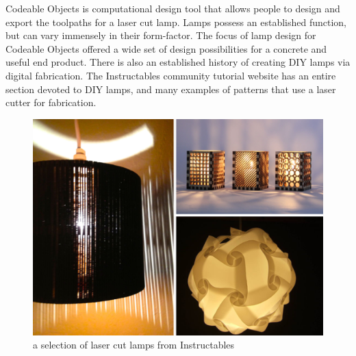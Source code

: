 Codeable Objects is computational design tool that allows people to design and export the toolpaths for a laser cut lamp. Lamps possess an established function, but can vary immensely in their form-factor. The focus of lamp design for Codeable Objects offered a wide set of design possibilities for a concrete and useful end product. There is also an established history of creating DIY lamps via digital fabrication. The Instructables community tutorial website has an entire section devoted to DIY lamps, and many examples of patterns that use a laser cutter for fabrication. 
\begin{center}
\begin{figure}[h!]
\includegraphics[width=6.5in]{images/instructables_lamps.png}
\caption{a selection of laser cut lamps from Instructables}
\end{figure}
\end{center}
